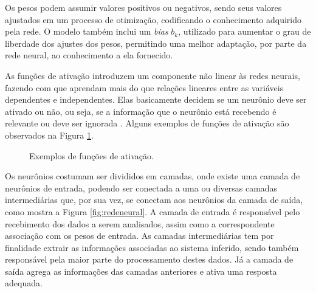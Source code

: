 Os pesos podem assumir valores positivos ou negativos, sendo seus valores ajustados em um processo de otimização, codificando o conhecimento adquirido pela rede. O modelo também inclui um \textit{bias} $b_{k}$, utilizado para aumentar o grau de liberdade dos ajustes dos pesos, permitindo uma melhor adaptação, por parte da rede neural, ao conhecimento a ela fornecido.

As funções de ativação introduzem um componente não linear às redes neurais, fazendo com que aprendam mais do que relações lineares entre as variáveis dependentes e independentes. Elas basicamente decidem se um neurônio deve ser ativado ou não, ou seja, se a informação que o neurônio está recebendo é relevante ou deve ser ignorada \cite{deeplearningb}.  Alguns exemplos de funções de ativação são observados na Figura \ref{fig:activacao}.

\begin{figure}[ht]
  \centering
   \caption{Exemplos de funções de ativação.}
  \label{fig:activacao}
\end{figure}

Os neurônios costumam ser divididos em camadas, onde existe uma camada de neurônios de entrada, podendo ser conectada a uma ou diversas camadas intermediárias que, por sua vez, se conectam aos neurônios da camada de saída, como mostra a Figura \ref{fig:redeneural}. A camada de entrada é responsável pelo recebimento dos dados a serem analisados, assim como a correspondente associação com os pesos de entrada. As camadas intermediárias tem por finalidade extrair as informações associadas ao sistema inferido, sendo também responsável pela maior parte do processamento destes dados. Já a camada de saída agrega as informações das camadas anteriores e ativa uma resposta adequada.

